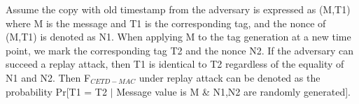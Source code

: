 \documentclass{article}
\begin{document}
Assume the copy with old timestamp from the adversary is expressed as (M,T1) where M is the message and T1 is the corresponding tag, and the nonce of (M,T1) is denoted as N1. When applying M to the tag generation at a new time point, we mark the corresponding tag T2 and the nonce N2. If the adversary can succeed a replay attack, then T1 is identical to T2 regardless of the equality of N1 and N2.
Then F$_{CETD-MAC}$ under replay attack can be denoted as the probability Pr[T1 = T2 $\mid$ Message value is M \& N1,N2 are randomly generated]. 

%


\end{document}
